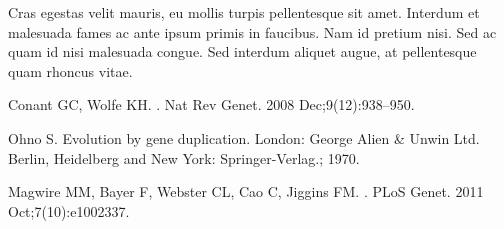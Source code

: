 \documentclass[10pt,letterpaper]{article}
\begin{document}
Cras egestas velit mauris, eu mollis turpis pellentesque sit
amet. Interdum et malesuada fames ac ante ipsum primis in
faucibus. Nam id pretium nisi. Sed ac quam id nisi malesuada
congue. Sed interdum aliquet augue, at pellentesque quam rhoncus
vitae.

\nolinenumbers

%
%
%
\begin{thebibliography}{10}

Conant GC, Wolfe KH.
.
\newblock Nat Rev Genet. 2008 Dec;9(12):938--950.

Ohno S.
\newblock Evolution by gene duplication.
\newblock London: George Alien \& Unwin Ltd. Berlin, Heidelberg and New York:
  Springer-Verlag.; 1970.

Magwire MM, Bayer F, Webster CL, Cao C, Jiggins FM.
.
\newblock PLoS Genet. 2011 Oct;7(10):e1002337.

\end{thebibliography}
\end{document}
